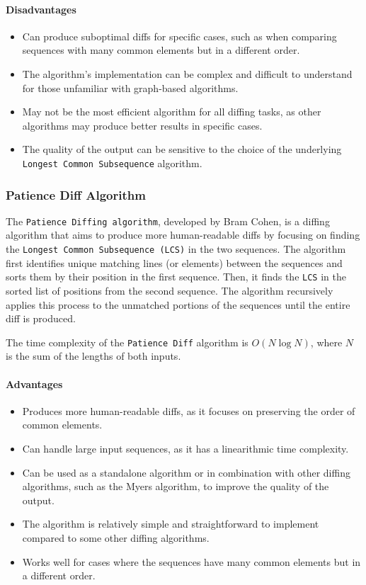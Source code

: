 \paragraph{Disadvantages}
\begin{itemize}
    \item Can produce suboptimal diffs for specific cases, such as when comparing sequences with many common elements but in a different order.
    \item The algorithm's implementation can be complex and difficult to understand for those unfamiliar with graph-based algorithms.
    \item May not be the most efficient algorithm for all diffing tasks, as other algorithms may produce better results in specific cases.
    \item The quality of the output can be sensitive to the choice of the underlying \lstinline{Longest Common Subsequence} algorithm.
\end{itemize}

\subsubsection{Patience Diff Algorithm}
The \lstinline{Patience Diffing algorithm}, developed by Bram Cohen, is a diffing algorithm that aims to produce more human-readable diffs by focusing on finding the \lstinline{Longest Common Subsequence (LCS)} in the two sequences. The algorithm first identifies unique matching lines (or elements) between the sequences and sorts them by their position in the first sequence. Then, it finds the \lstinline{LCS} in the sorted list of positions from the second sequence. The algorithm recursively applies this process to the unmatched portions of the sequences until the entire diff is produced\cite{coglan_patience_2017}.
\smallskip

The time complexity of the \lstinline{Patience Diff} algorithm is $O(N\log N)$, where $N$ is the sum of the lengths of both inputs.


\paragraph{Advantages}
\begin{itemize}
    \item Produces more human-readable diffs, as it focuses on preserving the order of common elements.
    \item Can handle large input sequences, as it has a linearithmic time complexity\cite{coglan_patience_2017}.
    \item Can be used as a standalone algorithm or in combination with other diffing algorithms, such as the Myers algorithm, to improve the quality of the output.
    \item The algorithm is relatively simple and straightforward to implement compared to some other diffing algorithms.
    \item Works well for cases where the sequences have many common elements but in a different order.
\end{itemize}
